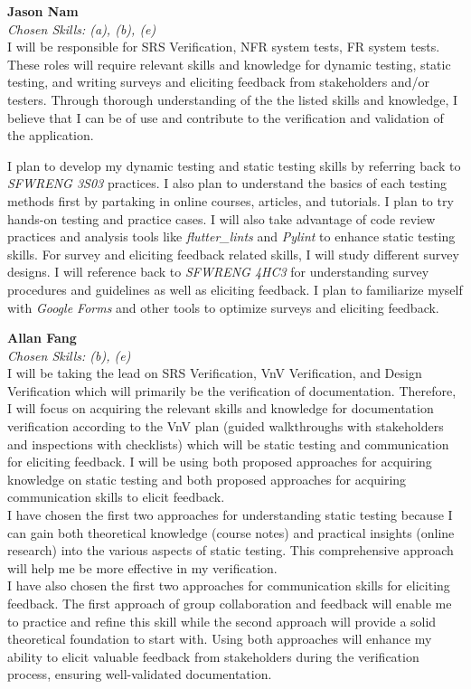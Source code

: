\documentclass[12pt, titlepage]{article}
\begin{document}
\begin{enumerate}
  \medskip
  \textbf{Jason Nam}\\
  \textit{Chosen Skills: (a), (b), (e)}\\
  I will be responsible for SRS Verification, NFR system tests, FR system tests. These roles will require relevant skills and knowledge for dynamic testing, static testing, and writing surveys and eliciting feedback from stakeholders and/or testers. Through thorough understanding of the the listed skills and knowledge, I believe that I can be of use and contribute to the verification and validation of the application.\par
  I plan to develop my dynamic testing and static testing skills by referring back to \textit{SFWRENG 3S03} practices. I also plan to understand the basics of each testing methods first by partaking in online courses, articles, and tutorials. I plan to try hands-on testing and practice cases. I will also take advantage of code review practices and analysis tools like \textit{flutter\_lints} and \textit{Pylint} to enhance static testing skills. For survey and eliciting feedback related skills, I will study different survey designs. I will reference back to \textit{SFWRENG 4HC3} for understanding survey procedures and guidelines as well as eliciting feedback. I plan to familiarize myself with \textit{Google Forms} and other tools to optimize surveys and eliciting feedback.

  \medskip
  \textbf{Allan Fang}\\
  \textit{Chosen Skills: (b), (e) } \\
  I will be taking the lead on SRS Verification, VnV Verification, and Design Verification which will primarily be the verification of documentation. Therefore, I will focus on acquiring the relevant skills and knowledge for documentation verification according to the VnV plan (guided walkthroughs with stakeholders and inspections with checklists) which will be static testing and communication for eliciting feedback. I will be using both proposed approaches for acquiring knowledge on static testing and both proposed approaches for acquiring communication skills to elicit feedback. \\
  I have chosen the first two approaches for understanding static testing because I can gain both theoretical knowledge (course notes) and practical insights (online research) into the various aspects of static testing. This comprehensive approach will help me be more effective in my verification.\\
  I have also chosen the first two approaches for communication skills for eliciting feedback. The first approach of group collaboration and feedback will enable me to practice and refine this skill while the second approach will provide a solid theoretical foundation to start with. Using both approaches will enhance my ability to elicit valuable feedback from stakeholders during the verification process, ensuring well-validated documentation.

  
\end{enumerate}
\end{document}

